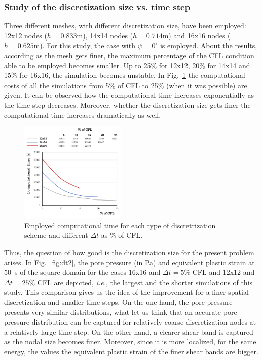 \documentclass[twocolumn]{svjour3}          %
\begin{document}
{\color{blue}
\subsubsection{Study of the discretization size vs. time step}

Three different meshes, with different discretization size, have been employed: 12x12 nodes ($h=0.833$m), 14x14 nodes ($h=0.714$m) and 16x16 nodes ($h=0.625$m). For this study, the case with $\psi=0^\circ$ is employed. About the results, according as the mesh gets finer, the maximum percentage of the CFL condition able to be employed becomes smaller. Up to 25\% for 12x12, 20\% for 14x14 and 15\% for 16x16, the simulation becomes unstable. In Fig.~\ref{fig:dt1} the computational costs of all the simulations from 5\% of CFL to 25\% (when it was possible) are given. It can be observed how the computational time increases exponentially as the time step decreases. Moreover, whether the discretization size gets finer the computational time increases dramatically as well. 

\begin{figure}
  \includegraphics[width=0.45\textwidth]{Fig/Tiempos_VC.pdf}
\caption{Employed computational time for each type of discretrization scheme and different $\Delta t$ as \% of CFL.}
\label{fig:dt1}      
\end{figure}

Thus, the question of how good is the discretization size for the present problem arises. In Fig.~\ref{fig:dt2}, the pore pressure (in Pa) and equivalent plastic strain at 50~s of the square domain for the cases 16x16 and $\Delta t=5\%$ CFL and 12x12 and $\Delta t=25\%$ CFL are depicted, \textit{i.e.}, the largest and the shorter simulations of this study. This comparison gives us the idea of the improvement for a finer spatial discretization and smaller time steps. On the one hand, the pore pressure presents very similar distributions, what let us think that an accurate pore pressure distribution can be captured for relatively coarse discretization nodes at a relatively large time step. On the other hand, a clearer shear band is captured as the nodal size becomes finer. Moreover, since it is more localized, for the same energy, the values the equivalent plastic strain of the finer shear bands are bigger. 

}
\end{document}
